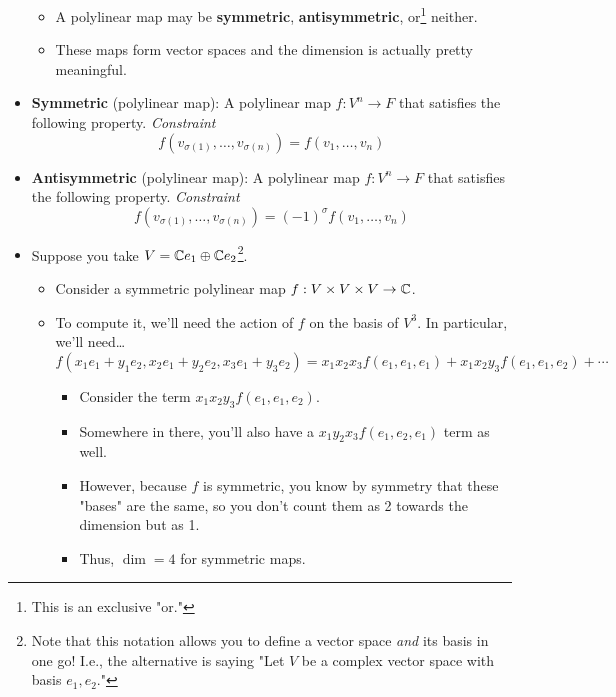 \documentclass[../notes.tex]{subfiles}
\begin{document}
\begin{itemize}
\begin{itemize}
        \item A polylinear map may be \textbf{symmetric}, \textbf{antisymmetric}, or\footnote{This is an exclusive "or."} neither.
        \item These maps form vector spaces and the dimension is actually pretty meaningful.
    \end{itemize}
    \item \textbf{Symmetric} (polylinear map): A polylinear map $f:V^n\to F$ that satisfies the following property. \emph{Constraint}
    \begin{equation*}
        f(v_{\sigma(1)},\dots,v_{\sigma(n)}) = f(v_1,\dots,v_n)
    \end{equation*}
    \item \textbf{Antisymmetric} (polylinear map): A polylinear map $f:V^n\to F$ that satisfies the following property. \emph{Constraint}
    \begin{equation*}
        f(v_{\sigma(1)},\dots,v_{\sigma(n)}) = (-1)^\sigma f(v_1,\dots,v_n)
    \end{equation*}
    \item Suppose you take $V=\mathbb{C} e_1\oplus\mathbb{C} e_2$\footnote{Note that this notation allows you to define a vector space \emph{and} its basis in one go! I.e., the alternative is saying "Let $V$ be a complex vector space with basis $e_1,e_2$."}.
    \begin{itemize}
        \item Consider a symmetric polylinear map $f:V\times V\times V\to\mathbb{C}$.
        \item To compute it, we'll need the action of $f$ on the basis of $V^3$. In particular, we'll need\dots
        \begin{equation*}
            f(x_1e_1+y_1e_2,x_2e_1+y_2e_2,x_3e_1+y_3e_2) = x_1x_2x_3f(e_1,e_1,e_1)+x_1x_2y_3f(e_1,e_1,e_2)+\cdots
        \end{equation*}
        \begin{itemize}
            \item Consider the term $x_1x_2y_3f(e_1,e_1,e_2)$.
            \item Somewhere in there, you'll also have a $x_1y_2x_3f(e_1,e_2,e_1)$ term as well.
            \item However, because $f$ is symmetric, you know by symmetry that these "bases" are the same, so you don't count them as 2 towards the dimension but as 1.
            \item Thus, $\dim=4$ for symmetric maps.
        \end{itemize}

\end{itemize}
\end{itemize}
\end{document}
